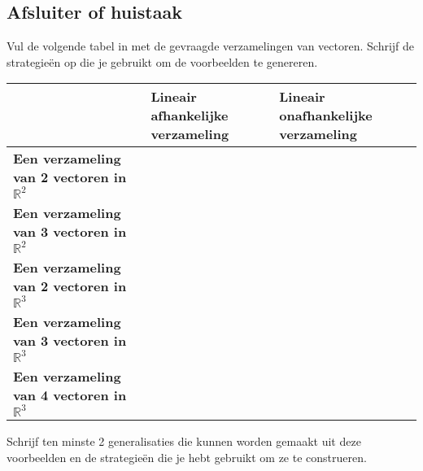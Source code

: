 \documentclass{ximera}
\begin{document}
\subsection*{Afsluiter of huistaak}
Vul de volgende tabel in met de gevraagde verzamelingen van vectoren.
Schrijf de strategieën op die je gebruikt om de voorbeelden te genereren.
\begin{table}[H]
\begin{tabular}{|p{4cm}|p{4cm}|p{4cm}|}
\hline
& \textbf{Lineair afhankelijke verzameling} & \textbf{Lineair onafhankelijke verzameling} \\
\hline
\textbf{Een verzameling van 2 vectoren in $\mathbb{R}^2$} & & \\
\hline
\textbf{Een verzameling van 3 vectoren in $\mathbb{R}^2$} & & \\
\hline
\textbf{Een verzameling van 2 vectoren in $\mathbb{R}^3$} & & \\
\hline
\textbf{Een verzameling van 3 vectoren in $\mathbb{R}^3$} & & \\
\hline
\textbf{Een verzameling van 4 vectoren in $\mathbb{R}^3$} & & \\
\hline
\end{tabular}
\end{table}
Schrijf ten minste 2 generalisaties die kunnen worden gemaakt uit deze voorbeelden en de strategieën die je hebt gebruikt om ze te construeren.
\end{document}
